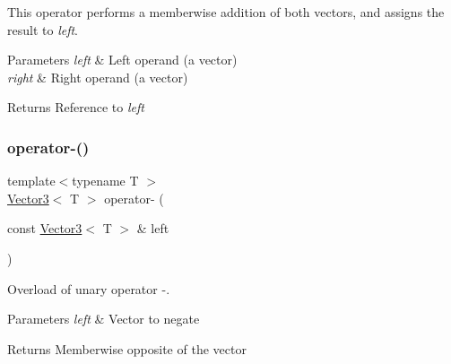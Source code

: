 This operator performs a memberwise addition of both vectors, and assigns the result to {\itshape left}.


\begin{DoxyParams}{Parameters}
{\em left} & Left operand (a vector) \\
\hline
{\em right} & Right operand (a vector)\\
\hline
\end{DoxyParams}
\begin{DoxyReturn}{Returns}
Reference to {\itshape left} 
\end{DoxyReturn}
\mbox{\label{classsf_1_1_vector3_a9b75d2fb9b0f2fd9fe33f8f06f9dda75}} 
\subsubsection{\texorpdfstring{operator-\/()}{operator-()}\hspace{0.1cm}{\footnotesize\ttfamily [1/2]}}
{\footnotesize\ttfamily template$<$typename T $>$ \\
\hyperlink{classsf_1_1_vector3}{Vector3}$<$ T $>$ operator-\/ (\begin{DoxyParamCaption}\item[{const \hyperlink{classsf_1_1_vector3}{Vector3}$<$ T $>$ \&}]{left }\end{DoxyParamCaption})\hspace{0.3cm}{\ttfamily [related]}}



Overload of unary operator -\/. 


\begin{DoxyParams}{Parameters}
{\em left} & Vector to negate\\
\hline
\end{DoxyParams}
\begin{DoxyReturn}{Returns}
Memberwise opposite of the vector 
\end{DoxyReturn}
\mbox{\label{classsf_1_1_vector3_abe0b9411c00cf807bf8a5f835874bd2a}} 
